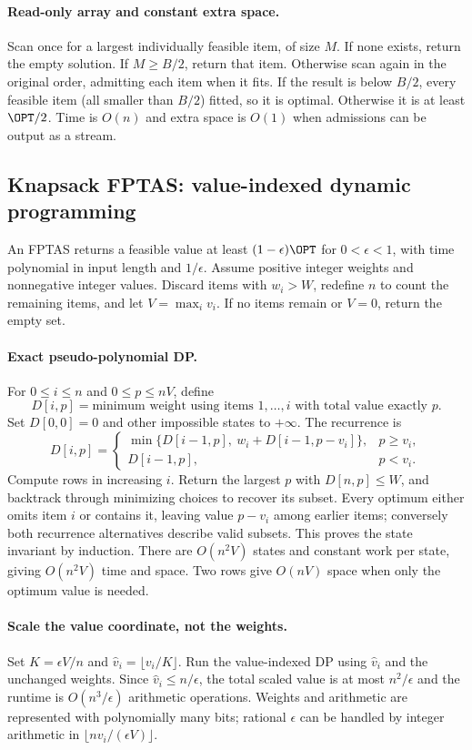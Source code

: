 \paragraph{Read-only array and constant extra space.}
Scan once for a largest individually feasible item, of size $M$. If none exists, return
the empty solution. If $M\ge B/2$, return that item. Otherwise scan again in the original
order, admitting each item when it fits. If the result is below $B/2$, every feasible item
(all smaller than $B/2$) fitted, so it is optimal. Otherwise it is at least $\OPT/2$.
Time is $O(n)$ and extra space is $O(1)$ when admissions can be output as a stream.

\subsection{Knapsack FPTAS: value-indexed dynamic programming}
\label{gre:fptas}
An FPTAS returns a feasible value at least $(1-\epsilon)\OPT$ for $0<\epsilon<1$, with
time polynomial in input length and $1/\epsilon$. Assume positive integer weights and
nonnegative integer values. Discard items with $w_i>W$, redefine $n$ to count the remaining
items, and let $V=\max_i v_i$. If no items remain or $V=0$, return the empty set.

\paragraph{Exact pseudo-polynomial DP.}
For $0\le i\le n$ and $0\le p\le nV$, define
\[
D[i,p]=\text{minimum weight using items }1,\ldots,i\text{ with total value exactly }p.
\]
Set $D[0,0]=0$ and other impossible states to $+\infty$. The recurrence is
\[
D[i,p]=
\begin{cases}
\min\{D[i-1,p],\ w_i+D[i-1,p-v_i]\},&p\ge v_i,\\
D[i-1,p],&p<v_i.
\end{cases}
\]
Compute rows in increasing $i$. Return the largest $p$ with $D[n,p]\le W$, and backtrack
through minimizing choices to recover its subset. Every optimum either omits item $i$ or
contains it, leaving value $p-v_i$ among earlier items; conversely both recurrence alternatives
describe valid subsets. This proves the state invariant by induction. There are $O(n^2V)$
states and constant work per state, giving $O(n^2V)$ time and space. Two rows give $O(nV)$
space when only the optimum value is needed.

\paragraph{Scale the value coordinate, not the weights.}
Set $K=\epsilon V/n$ and $\hat v_i=\lfloor v_i/K\rfloor$. Run the value-indexed DP using
$\hat v_i$ and the unchanged weights. Since $\hat v_i\le n/\epsilon$, the total scaled
value is at most $n^2/\epsilon$ and the runtime is $O(n^3/\epsilon)$ arithmetic operations.
Weights and arithmetic are represented with polynomially many bits; rational $\epsilon$
can be handled by integer arithmetic in $\lfloor nv_i/(\epsilon V)\rfloor$.

